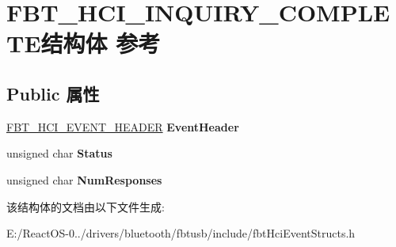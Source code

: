 \hypertarget{struct_f_b_t___h_c_i___i_n_q_u_i_r_y___c_o_m_p_l_e_t_e}{}\section{F\+B\+T\+\_\+\+H\+C\+I\+\_\+\+I\+N\+Q\+U\+I\+R\+Y\+\_\+\+C\+O\+M\+P\+L\+E\+T\+E结构体 参考}
\label{struct_f_b_t___h_c_i___i_n_q_u_i_r_y___c_o_m_p_l_e_t_e}
\subsection*{Public 属性}
\begin{DoxyCompactItemize}
\item 
\mbox{\label{struct_f_b_t___h_c_i___i_n_q_u_i_r_y___c_o_m_p_l_e_t_e_acd56f250bb747f05f6bb0d491d7b6a21}} 
\hyperlink{struct_f_b_t___h_c_i___e_v_e_n_t___h_e_a_d_e_r}{F\+B\+T\+\_\+\+H\+C\+I\+\_\+\+E\+V\+E\+N\+T\+\_\+\+H\+E\+A\+D\+ER} {\bfseries Event\+Header}
\item 
\mbox{\label{struct_f_b_t___h_c_i___i_n_q_u_i_r_y___c_o_m_p_l_e_t_e_a8148af12b151bb3057783de52e5ce3b1}} 
unsigned char {\bfseries Status}
\item 
\mbox{\label{struct_f_b_t___h_c_i___i_n_q_u_i_r_y___c_o_m_p_l_e_t_e_a480c2c7601bfe4d2bdb0d71ef70e03bd}} 
unsigned char {\bfseries Num\+Responses}
\end{DoxyCompactItemize}


该结构体的文档由以下文件生成\+:\begin{DoxyCompactItemize}
\item 
E\+:/\+React\+O\+S-\/0../drivers/bluetooth/fbtusb/include/fbt\+Hci\+Event\+Structs.\+h\end{DoxyCompactItemize}
